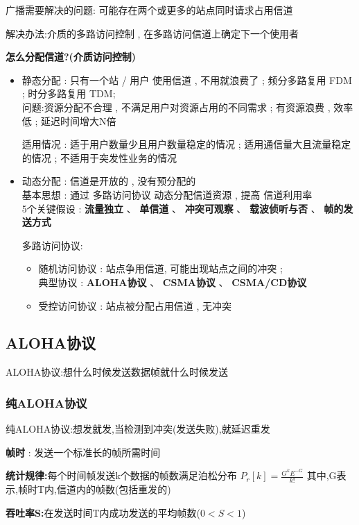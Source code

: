 \documentclass[UTF8,a4paper]{ctexart}
\begin{document}
广播需要解决的问题: 可能存在两个或更多的站点同时请求占用信道

解决办法:介质的多路访问控制 , 在多路访问信道上确定下一个使用者

\textbf{怎么分配信道?(介质访问控制)}
\begin{itemize}
  \item 静态分配 : 只有一个站 / 用户 使用信道 , 不用就浪费了 ; 频分多路复用 FDM ; 时分多路复用 TDM;\\
  问题:资源分配不合理 , 不满足用户对资源占用的不同需求 ; 有资源浪费 , 效率低 ; 延迟时间增大N倍

  适用情况 : 适于用户数量少且用户数量稳定的情况 ; 适用通信量大且流量稳定的情况 ; 不适用于突发性业务的情况
  \item 动态分配 : 信道是开放的 , 没有预分配的\\
  基本思想 : 通过 多路访问协议 动态分配信道资源 , 提高 信道利用率 \\
  5个关键假设 : \textbf{流量独立} 、 \textbf{单信道} 、 \textbf{冲突可观察} 、 \textbf{载波侦听与否} 、 \textbf{帧的发送方式}

  多路访问协议:
  \begin{itemize}
    \item 随机访问协议 : 站点争用信道, 可能出现站点之间的冲突 ; \\
    典型协议 : \textbf{ALOHA协议} 、 \textbf{CSMA协议} 、 \textbf{CSMA/CD协议}
    \item 受控访问协议 : 站点被分配占用信道 , 无冲突
  \end{itemize}

\end{itemize}

\subsection{ALOHA协议}

ALOHA协议:想什么时候发送数据帧就什么时候发送

\subsubsection{纯ALOHA协议}
纯ALOHA协议:想发就发,当检测到冲突(发送失败),就延迟重发

\textbf{帧时} : 发送一个标准长的帧所需时间

\textbf{统计规律:}每个时间帧发送k个数据的帧数满足泊松分布
$P_r[k] = \frac{G^kE^{-G}}{k!}$
其中,G表示,帧时T内,信道内的帧数(包括重发的)

\textbf{吞吐率S:}在发送时间T内成功发送的平均帧数($0 < S < 1$)
\end{document}
